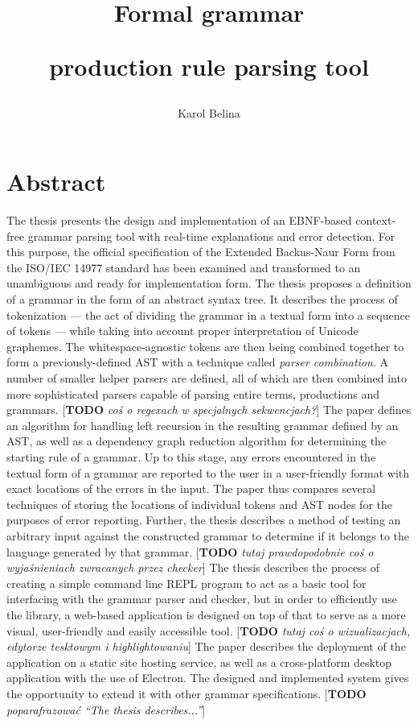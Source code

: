 \documentclass[english,engineering]{wizthesis}
\author{Karol Belina}
\title{Formal grammar\par production rule parsing tool}
\newcommand{\todo}[1]{{\color{red}[\textbf{TODO} \textit{#1}]}}
\begin{document}
\frontmatter %

\maketitle

\chapter*{Abstract}

The thesis presents the design and implementation of an EBNF-based context-free
grammar parsing tool with real-time explanations and error detection. For this
purpose, the official specification of the Extended Backus-Naur Form from the
ISO/IEC 14977 standard has been examined and transformed to an unambiguous and
ready for implementation form. The thesis proposes a definition of a grammar in
the form of an abstract syntax tree. It describes the process of tokenization
--- the act of dividing the grammar in a textual form into a sequence of tokens
--- while taking into account proper interpretation of Unicode graphemes. The
whitespace-agnostic tokens are then being combined together to form a
previously-defined AST with a technique called \textit{parser combination}. A
number of smaller helper parsers are defined, all of which are then combined
into more sophisticated parsers capable of parsing entire terms, productions and
grammars. \todo{coś o regexach w specjalnych sekwencjach?} The paper defines an
algorithm for handling left recursion in the resulting grammar defined by an
AST, as well as a dependency graph reduction algorithm for determining the
starting rule of a grammar. Up to this stage, any errors encountered in the
textual form of a grammar are reported to the user in a user-friendly format
with exact locations of the errors in the input. The paper thus compares several
techniques of storing the locations of individual tokens and AST nodes for the
purposes of error reporting. Further, the thesis describes a method of testing
an arbitrary input against the constructed grammar to determine if it belongs to
the language generated by that grammar.
\todo{tutaj prawdopodobnie coś o wyjaśnieniach zwracanych przez checker}
The thesis describes the process of creating a simple command line REPL program
to act as a basic tool for interfacing with the grammar parser and checker, but
in order to efficiently use the library, a web-based application is designed on
top of that to serve as a more visual, user-friendly and easily accessible tool.
\todo{tutaj coś o wizualizacjach, edytorze tesktowym i highlightowaniu} The
paper describes the deployment of the application on a static site hosting
service, as well as a cross-platform desktop application with the use of
Electron. The designed and implemented system gives the opportunity to extend it
with other grammar specifications.
\todo{poparafrazować ``The thesis describes...''}
\end{document}
